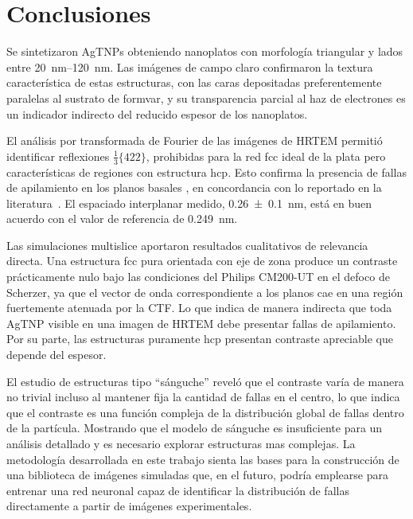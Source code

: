 \section{Conclusiones}

Se sintetizaron AgTNPs obteniendo nanoplatos con morfología triangular y lados entre \qtyrange{20}{120}{\nano\meter}. Las imágenes de campo claro confirmaron la textura característica de estas estructuras, con las caras  depositadas preferentemente paralelas al sustrato de formvar, y su transparencia parcial al haz de electrones es un indicador indirecto del reducido espesor de los nanoplatos.

El análisis por transformada de Fourier de las imágenes de HRTEM permitió identificar reflexiones $\frac{1}{3}\{422\}$, prohibidas para la red fcc ideal de la plata pero características de regiones con estructura hcp. Esto confirma la presencia de fallas de apilamiento en los planos basales , en concordancia con lo reportado en la literatura~\cite{rocha2007,tan2021}. El espaciado interplanar medido, \SI{0.26 \pm 0.1}{\nano\metre}, está en buen acuerdo con el valor de referencia de \SI{0.249}{\nano\metre}.

Las simulaciones multislice aportaron resultados cualitativos de relevancia directa. Una estructura fcc pura orientada con eje de zona \hkl[111] produce un contraste prácticamente nulo bajo las condiciones del Philips CM200-UT en el defoco de Scherzer, ya que el vector de onda correspondiente a los planos  cae en una región fuertemente atenuada por la CTF. Lo que indica de manera indirecta que toda AgTNP visible en una imagen de HRTEM debe presentar fallas de apilamiento. Por su parte, las estructuras puramente hcp presentan contraste apreciable que depende del espesor.

El estudio de estructuras tipo ``sánguche'' reveló que el contraste varía de manera no trivial incluso al mantener fija la cantidad de fallas en el centro, lo que indica que el contraste es una función compleja de la distribución global de fallas dentro de la partícula. Mostrando que el modelo de sánguche es insuficiente para un análisis detallado y es necesario explorar estructuras mas complejas. La metodología desarrollada en este trabajo sienta las bases para la construcción de una biblioteca de imágenes simuladas que, en el futuro, podría emplearse para entrenar una red neuronal capaz de identificar la distribución de fallas directamente a partir de imágenes experimentales.